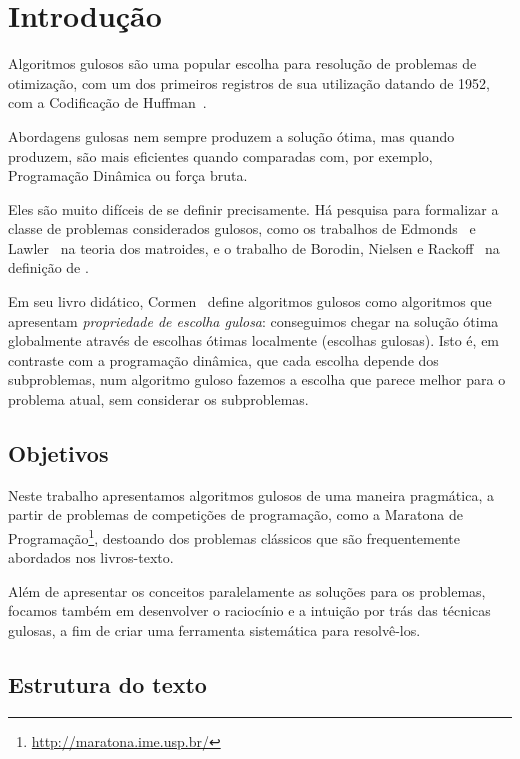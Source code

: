 \chapter{Introdução}
\label{intro}

Algoritmos gulosos são uma popular escolha para resolução de problemas de otimização, com um dos primeiros registros de sua utilização datando de 1952, com a Codificação de Huffman~\cite{huffman1952method}.

Abordagens gulosas nem sempre produzem a solução ótima, mas quando produzem, são mais eficientes quando comparadas com, por exemplo, Programação Dinâmica ou força bruta.

Eles são muito difíceis de se definir precisamente. Há pesquisa para formalizar a classe de problemas considerados gulosos, como os trabalhos de Edmonds~\cite{Edmonds1971} e Lawler~\cite{lawler2001combinatorial} na teoria dos matroides, e o trabalho de Borodin, Nielsen e Rackoff~\cite{Borodin2003} na definição de .

Em seu livro didático, Cormen~\cite{CLRS} define algoritmos gulosos como algoritmos que apresentam \emph{propriedade de escolha gulosa}: conseguimos chegar na solução ótima globalmente através de escolhas ótimas localmente (escolhas gulosas). Isto é, em contraste com a programação dinâmica, que cada escolha depende dos subproblemas, num algoritmo guloso fazemos a escolha que parece melhor para o problema atual, sem considerar os subproblemas.

\section{Objetivos}

Neste trabalho apresentamos algoritmos gulosos de uma maneira pragmática, a partir de problemas de competições de programação, como a Maratona de Programação\footnote{\url{http://maratona.ime.usp.br/}}, destoando dos problemas clássicos que são frequentemente abordados nos livros-texto.

Além de apresentar os conceitos paralelamente as soluções para os problemas, focamos também em desenvolver o raciocínio e a intuição por trás das técnicas gulosas, a fim de criar uma ferramenta sistemática para resolvê-los.

\section{Estrutura do texto}

